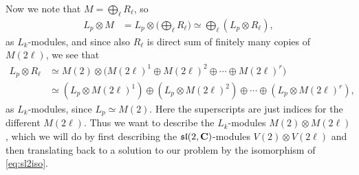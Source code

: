 Now we note that $M=\bigoplus_{\ell} R_\ell$, so 
\begin{align*}
  L_p\otimes M &= L_p\otimes \bigl( \bigoplus_{\ell} R_\ell \bigr) \simeq \bigoplus_{\ell} (L_p\otimes R_\ell),
\end{align*}
as $L_k$-modules, and since also $R_\ell$ is direct sum of finitely many copies of $M(2\ell)$, we see that
\begin{align*}
  L_p\otimes R_\ell &\simeq M(2)\otimes \bigl( M(2\ell)^1 \oplus M(2\ell)^2 \oplus \dotsb \oplus M(2\ell)^r \bigr) \\
  &\simeq (L_p\otimes M(2\ell)^1) \oplus (L_p\otimes M(2\ell)^2) \oplus \dotsb \oplus (L_p\otimes M(2\ell)^r),
\end{align*}
as $L_k$-modules, since $L_p\simeq M(2)$. Here the superscripts are just indices for the different $M(2\ell)$. Thus we want to describe the $L_k$-modules $M(2)\otimes M(2\ell)$, which we will do by first describing the $\mathfrak{sl}(2,\mathbf{C})$-modules $V(2)\otimes V(2\ell)$ and then translating back to a solution to our problem by the isomorphism of \cref{eq:sl2iso}.

